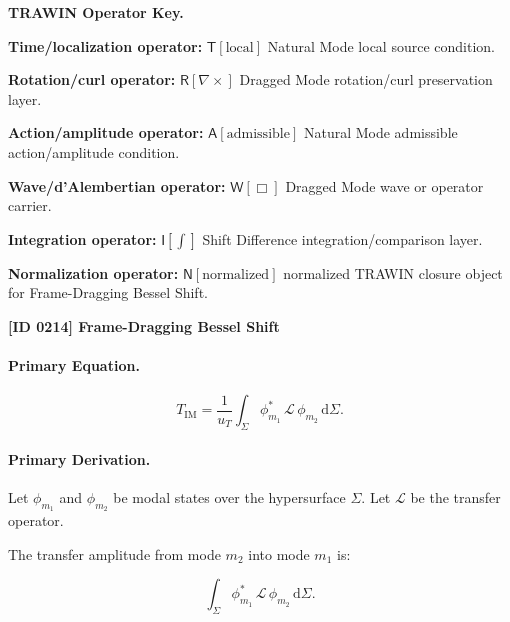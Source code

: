 \par\vspace{0.45\baselineskip}
\noindent\begin{minipage}[t]{\linewidth}
\begingroup
\small
\raggedright
\textbf{TRAWIN Operator Key.}\par
\noindent\textbf{Time/localization operator:} $\mathsf{T}\!\left[\mathrm{local}\right]$ Natural Mode local source condition.\par
\noindent\textbf{Rotation/curl operator:} $\mathsf{R}\!\left[\nabla\times\right]$ Dragged Mode rotation/curl preservation layer.\par
\noindent\textbf{Action/amplitude operator:} $\mathsf{A}\!\left[\mathrm{admissible}\right]$ Natural Mode admissible action/amplitude condition.\par
\noindent\textbf{Wave/d'Alembertian operator:} $\mathsf{W}\!\left[\Box\right]$ Dragged Mode wave or operator carrier.\par
\noindent\textbf{Integration operator:} $\mathsf{I}\!\left[\int\right]$ Shift Difference integration/comparison layer.\par
\noindent\textbf{Normalization operator:} $\mathsf{N}\!\left[\mathrm{normalized}\right]$ normalized TRAWIN closure object for Frame-Dragging Bessel Shift.\par
\endgroup
\end{minipage}

\clearpage
\noindent\textbf{[ID 0214] Frame-Dragging Bessel Shift}\par
\vspace{0.35em}
\paragraph{Primary Equation.}
\begin{equation}
T_{\mathrm{IM}}
=
\frac{1}{u_T}
\int_{\Sigma}
\phi_{m_1}^{*}
\,\mathcal{L}\,
\phi_{m_2}
\,\mathrm{d}\Sigma .
\end{equation}

\paragraph{Primary Derivation.}
Let $\phi_{m_1}$ and $\phi_{m_2}$ be modal states over the hypersurface $\Sigma$.  
Let $\mathcal{L}$ be the transfer operator.

The transfer amplitude from mode $m_2$ into mode $m_1$ is:

\begin{equation}
\int_{\Sigma}
\phi_{m_1}^{*}
\,\mathcal{L}\,
\phi_{m_2}
\,\mathrm{d}\Sigma .
\end{equation}

